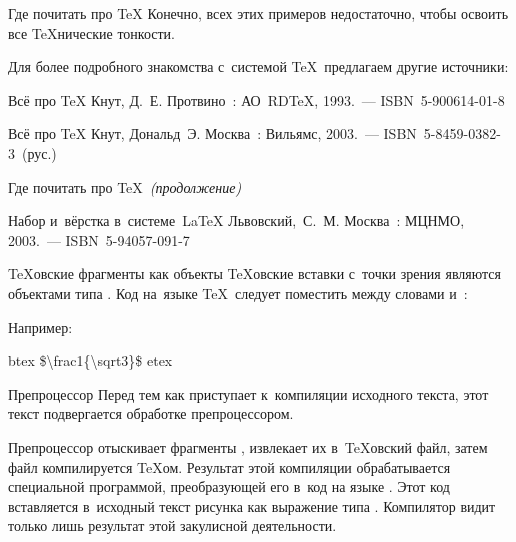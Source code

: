 
\begin{frame}{Где почитать про \TeX}
Конечно, всех этих примеров недостаточно, чтобы освоить все \TeX{}нические
тонкости.

Для более подробного знакомства с~системой \TeX\ предлагаем другие источники:

\begin{thebibliography}{}
Всё про \TeX
\newblock
Кнут, Д.~Е.
\newblock
Протвино~: АО RD\TeX, 1993.~— ISBN~5-900614-01-8

Всё про \TeX
\newblock
Кнут, Дональд~Э.
\newblock
Москва~: Вильямс, 2003.~— ISBN~5-8459-0382-3~(рус.)
\end{thebibliography}
\end{frame}


\begin{frame}{Где почитать про \TeX\ {\mdseries\itshape(продолжение)}}
\begin{thebibliography}{}
Набор и~вёрстка в~системе \LaTeX
\newblock
Львовский, С. М.
\newblock
Москва~: МЦНМО, 2003.~— ISBN~5-94057-091-7
\end{thebibliography}
\end{frame}


\begin{frame}{\TeX{}овские фрагменты как объекты }
\TeX{}овские вставки с~точки зрения  являются объектами типа
. Код на~языке \TeX\ следует поместить между словами
 и~:
\begin{center}
\Large
{}
\end{center}

Например:
\begin{programlisting}
btex \$\textbackslash frac1\{\textbackslash sqrt3\}\$ etex
\end{programlisting}
\end{frame}


\begin{frame}{Препроцессор}
Перед тем как  приступает к~компиляции исходного текста, этот
текст подвергается обработке препроцессором.

Препроцессор отыскивает фрагменты , извлекает их
в~\TeX{}овский файл, затем файл компилируется \TeX{}ом. Результат этой
компиляции обрабатывается специальной программой, преобразующей его в~код на
языке . Этот код вставляется в~исходный текст рисунка как
выражение типа . Компилятор  видит только
лишь результат этой закулисной деятельности.
\end{frame}

